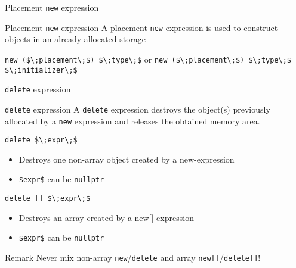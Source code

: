 \begin{frame}{Placement \texttt{new} expression}{}
  \begin{block}{Placement \texttt{new} expression}
    A placement \lstinline!new! expression is used to construct objects in an already allocated storage

    {
      \hfill\lstinline[mathescape]!new ($\;placement\;$) $\;type\;$! or \lstinline[mathescape]!new ($\;placement\;$) $\;type\;$ $\;initializer\;$!\hfill
    }
  \end{block}

  \begin{example}
  \end{example}
\end{frame}

\begin{frame}{\texttt{delete} expression}{}
  \begin{block}{\texttt{delete} expression}
    A \lstinline!delete! expression destroys the object(s) previously allocated by a \lstinline!new! expression and releases the obtained memory area.

    {
      \hfill\lstinline[mathescape]!delete $\;expr\;$!\hfill
    }
    \begin{itemize}
    \item
      Destroys one non-array object created by a new-expression
    \item
      \lstinline[mathescape]!$expr$! can be \lstinline!nullptr!
    \end{itemize}
    {
      \hfill\lstinline[mathescape]!delete [] $\;expr\;$!\hfill
    }
    \begin{itemize}
    \item
      Destroys an array created by a new[]-expression
    \item
      \lstinline[mathescape]!$expr$! can be \lstinline!nullptr!
    \end{itemize}
  \end{block}

  \begin{block}{Remark}
    Never mix non-array \lstinline!new!/\lstinline!delete! and array \lstinline!new[]!/\lstinline!delete[]!!
  \end{block}
\end{frame}

